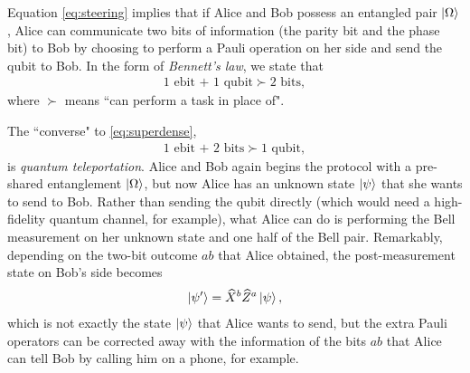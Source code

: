 \begin{example}\leavevmode
	
	Equation \eqref{eq:steering} implies that if Alice and Bob possess an entangled pair $\ket{\Omega}$, Alice can communicate two bits of information (the parity bit and the phase bit) to Bob by choosing to perform a Pauli operation on her side and send the qubit to Bob. In the form of \emph{Bennett's law}, we state that
	\begin{align}\label{eq:superdense}
		\textrm{1 ebit + 1 qubit} \succ \textrm{2 bits},
	\end{align} 
	where $\succ$ means ``can perform a task in place of".
\end{example}

\begin{example}[\bf Teleportation]\leavevmode
	
	The ``converse" to \eqref{eq:superdense},
		\begin{align}\label{eq:teleport}
		\textrm{1 ebit + 2 bits} \succ \textrm{1 qubit},
	\end{align} 
	is \emph{quantum teleportation}. Alice and Bob again begins the protocol with a pre-shared entanglement $\ket{\Omega}$, but now Alice has an unknown state $\ket{\psi}$ that she wants to send to Bob. Rather than sending the qubit directly (which would need a high-fidelity quantum channel, for example), what Alice can do is performing the Bell measurement on her unknown state and one half of the Bell pair. Remarkably, depending on the two-bit outcome $ab$ that Alice obtained, the post-measurement state on Bob's side becomes
	\begin{align}
		\ket{\psi'} = \widehat{X}^b \widehat{Z}^a \ket{\psi},
	\end{align}
which is not exactly the state $\ket{\psi}$ that Alice wants to send, but the extra Pauli operators can be corrected away with the information of the bits $ab$ that Alice can tell Bob by calling him on a phone, for example.
\end{example}
	
